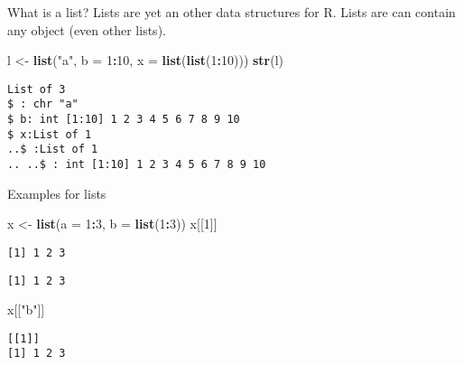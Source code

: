 \documentclass[ignorenonframetext,,t]{beamer}
\let\oldtextbf\textbf
\renewcommand{\textbf}[1]{\textcolor{spamwell}{\oldtextbf{#1}}}
\newenvironment{Shaded}{\begin{snugshade}}{\end{snugshade}}
\newcommand{\AttributeTok}[1]{\textcolor[rgb]{0.13,0.29,0.53}{#1}}
\newcommand{\DecValTok}[1]{\textcolor[rgb]{0.00,0.00,0.81}{#1}}
\newcommand{\FunctionTok}[1]{\textcolor[rgb]{0.13,0.29,0.53}{\textbf{#1}}}
\newcommand{\NormalTok}[1]{#1}
\newcommand{\OtherTok}[1]{\textcolor[rgb]{0.56,0.35,0.01}{#1}}
\newcommand{\SpecialCharTok}[1]{\textcolor[rgb]{0.81,0.36,0.00}{\textbf{#1}}}
\newcommand{\StringTok}[1]{\textcolor[rgb]{0.31,0.60,0.02}{#1}}
\begin{document}
\begin{frame}[fragile]
\begin{block}{What is a list?}
\label{what-is-a-list}
Lists are yet an other data structures for R. Lists are can contain any
object (even other lists).

\begin{Shaded}
\begin{Highlighting}[]
\NormalTok{l }\OtherTok{\textless{}{-}} \FunctionTok{list}\NormalTok{(}\StringTok{"a"}\NormalTok{, }\AttributeTok{b =} \DecValTok{1}\SpecialCharTok{:}\DecValTok{10}\NormalTok{, }\AttributeTok{x =} \FunctionTok{list}\NormalTok{(}\FunctionTok{list}\NormalTok{(}\DecValTok{1}\SpecialCharTok{:}\DecValTok{10}\NormalTok{)))}
\FunctionTok{str}\NormalTok{(l)}
\end{Highlighting}
\end{Shaded}

\begin{verbatim}
List of 3
$ : chr "a"
$ b: int [1:10] 1 2 3 4 5 6 7 8 9 10
$ x:List of 1
..$ :List of 1
.. ..$ : int [1:10] 1 2 3 4 5 6 7 8 9 10
\end{verbatim}
\end{block}
\end{frame}

\begin{frame}[fragile]
\begin{block}{Examples for lists}
\label{examples-for-lists}
\begin{Shaded}
\begin{Highlighting}[]
\NormalTok{x }\OtherTok{\textless{}{-}} \FunctionTok{list}\NormalTok{(}\AttributeTok{a =} \DecValTok{1}\SpecialCharTok{:}\DecValTok{3}\NormalTok{, }\AttributeTok{b =} \FunctionTok{list}\NormalTok{(}\DecValTok{1}\SpecialCharTok{:}\DecValTok{3}\NormalTok{))}
\NormalTok{x[[}\DecValTok{1}\NormalTok{]]}
\end{Highlighting}
\end{Shaded}

\begin{verbatim}
[1] 1 2 3
\end{verbatim}

\begin{Shaded}
\end{Shaded}

\begin{verbatim}
[1] 1 2 3
\end{verbatim}

\begin{Shaded}
\begin{Highlighting}[]
\NormalTok{x[[}\StringTok{"b"}\NormalTok{]]}
\end{Highlighting}
\end{Shaded}

\begin{verbatim}
[[1]]
[1] 1 2 3
\end{verbatim}
\end{block}
\end{frame}
\end{document}
